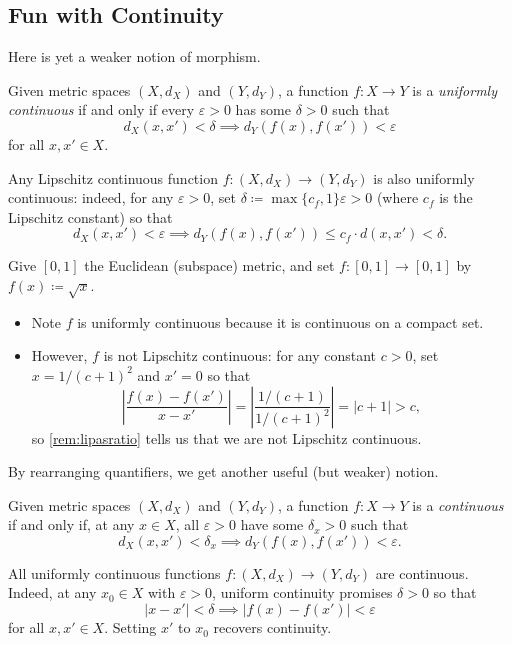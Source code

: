 \documentclass[../notes.tex]{subfiles}
\begin{document}
\subsection{Fun with Continuity}
Here is yet a weaker notion of morphism.
\begin{definition}
	Given metric spaces $(X,d_X)$ and $(Y,d_Y)$, a function $f\colon X\to Y$ is a \textit{uniformly continuous} if and only if every $\varepsilon>0$ has some $\delta>0$ such that
	\[d_X(x,x')<\delta\implies d_Y(f(x),f(x'))<\varepsilon\]
	for all $x,x'\in X$.
\end{definition}
\begin{example}
	Any Lipschitz continuous function $f\colon(X,d_X)\to(Y,d_Y)$ is also uniformly continuous: indeed, for any $\varepsilon>0$, set $\delta\coloneqq\max\{c_f,1\}\varepsilon>0$ (where $c_f$ is the Lipschitz constant) so that
	\[d_X(x,x')<\varepsilon\implies d_Y(f(x),f(x'))\le c_f\cdot d(x,x')<\delta.\]
\end{example}
\begin{example}
	Give $[0,1]$ the Euclidean (subspace) metric, and set $f\colon[0,1]\to[0,1]$ by $f(x)\coloneqq\sqrt x$.
	\begin{itemize}
		\item Note $f$ is uniformly continuous because it is continuous on a compact set.
		\item However, $f$ is not Lipschitz continuous: for any constant $c>0$, set $x=1/(c+1)^2$ and $x'=0$ so that
		\[\left|\frac{f(x)-f(x')}{x-x'}\right|=\left|\frac{1/(c+1)}{1/(c+1)^2}\right|=|c+1|>c,\]
		so \autoref{rem:lipasratio} tells us that we are not Lipschitz continuous.
	\end{itemize}
\end{example}
By rearranging quantifiers, we get another useful (but weaker) notion.
\begin{definition}[Continuous]
	Given metric spaces $(X,d_X)$ and $(Y,d_Y)$, a function $f\colon X\to Y$ is a \textit{continuous} if and only if, at any $x\in X$, all $\varepsilon>0$ have some $\delta_x>0$ such that
	\[d_X(x,x')<\delta_x\implies d_Y(f(x),f(x'))<\varepsilon.\]
\end{definition}
\begin{example}
	All uniformly continuous functions $f\colon(X,d_X)\to(Y,d_Y)$ are continuous. Indeed, at any $x_0\in X$ with $\varepsilon>0$, uniform continuity promises $\delta>0$ so that
	\[|x-x'|<\delta\implies|f(x)-f(x')|<\varepsilon\]
	for all $x,x'\in X$. Setting $x'$ to $x_0$ recovers continuity.
\end{example}
\end{document}
